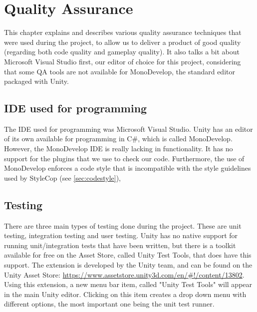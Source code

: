\chapter{Quality Assurance} \label{cha:qa}
    This chapter explains and describes various quality assurance techniques 
    that were used during the project, to allow us to deliver a product of 
    good quality (regarding both code quality and gameplay quality). It also
    talks a bit about Microsoft Visual Studio first, our editor of choice for
    this project, considering that some QA tools are not available for
    MonoDevelop, the standard editor packaged with Unity.
    
    \section{IDE used for programming} \label{sec:ide}
        The IDE used for programming was Microsoft Visual Studio. Unity has an editor
        of its own available for programming in C\#, which is called MonoDevelop.
        However, the MonoDevelop IDE is really lacking in functionality. It has no
        support for the plugins that we use to check our code. Furthermore, the use
        of MonoDevelop enforces a code style that is incompatible with the style 
        guidelines used by StyleCop (see \ref{sec:codestyle}), 
    
    \section{Testing} \label{sec:testing}
        There are three main types of testing done during the project. These are
        unit testing, integration testing and user testing. Unity has no native
        support for running unit\slash integration tests that have been written,
        but there is a toolkit available for free on the Asset Store, called
        Unity Test Tools,  that does have this support. The extension is
        developed by the Unity team, and can be found on the Unity Asset Store: 
        \url{https://www.assetstore.unity3d.com/en/#!/content/13802}.
        Using this extension, a new menu bar item, called "Unity Test Tools"
        will appear in the main Unity editor. Clicking on this item creates a drop
        down menu with different options, the most important one being the unit test
        runner.
        
